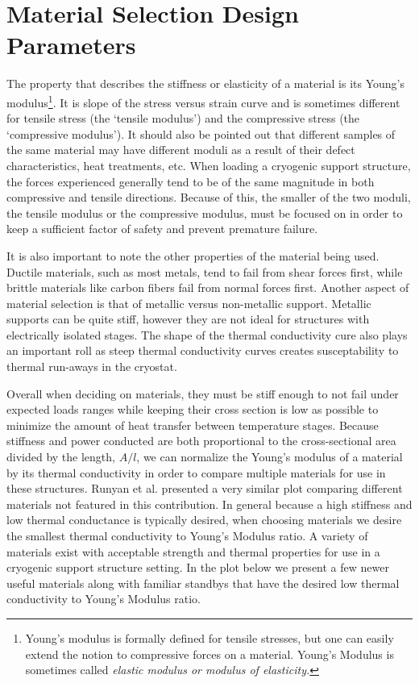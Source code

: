 \documentclass[final]{svjour2}
\begin{document}
\section{Material Selection Design Parameters}

The property that describes the stiffness or elasticity of a material is its Young's modulus\footnote{Young's modulus is formally defined for tensile stresses, but one can easily extend the notion to compressive forces on a material. Young's Modulus is sometimes called \em{elastic modulus} or \em{modulus of elasticity}.}. It is slope of the stress versus strain curve and is sometimes different for tensile stress (the `tensile modulus') and the compressive stress (the `compressive modulus'). It should also be pointed out that different samples of the same material may have different moduli as a result of their defect characteristics, heat treatments, etc. When loading a cryogenic support structure, the forces experienced generally tend to be of the same magnitude in both compressive and tensile directions.  Because of this, the smaller of the two moduli, the tensile modulus or the compressive modulus, must be focused on in order to keep a sufficient factor of safety and prevent premature failure.

It is also important to note the other properties of the material being used.  Ductile materials, such as most metals, tend to fail from shear forces first, while brittle materials like carbon fibers fail from normal forces first.  Another aspect of material selection is that of metallic versus non-metallic support. Metallic supports can be quite stiff, however they are not ideal for structures with electrically isolated stages.  The shape of the thermal conductivity cure also plays an important roll as steep thermal conductivity curves creates susceptability to thermal run-aways in the cryostat.

Overall when deciding on materials, they must be stiff enough to not fail under expected loads ranges while keeping their cross section is low as possible to minimize the amount of heat transfer between temperature stages. Because stiffness and power conducted are both proportional to the cross-sectional area divided by the length, $A/l$, we can normalize the Young's modulus of a material by its thermal conductivity in order to compare multiple materials for use in these structures. Runyan\cite{Runyan2008} et al. presented a very similar plot comparing different materials not featured in this contribution.  In general because a high stiffness and low thermal conductance is typically desired, when choosing materials we desire the smallest thermal conductivity to Young's Modulus ratio.\cite{Hastings1993}  A variety of materials exist with acceptable strength and thermal properties for use in a cryogenic support structure setting.  In the plot below we present a few newer useful materials along with familiar standbys that have the desired low thermal conductivity to Young's Modulus ratio.
\end{document}
